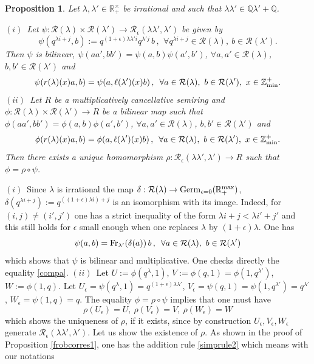 \documentclass[noams,lp]{compositio}
\newtheorem{prop}[thm]{Proposition}
\def\Q{{\mathbb Q}}
\def\R{{\mathbb R}}
\def\Z{{\mathbb Z}}
\def\cR{{\mathcal R}}
\def\qqq{\,,\,~\forall}
\def\zminp{\Z_{\rm min}^+}
\def\mc{multiplicatively cancellative }
\def\rmax{\R_+^{\rm max}}
\def\fr{{\rm Fr}}
\def\germ{{{\rm Germ}_{\epsilon=0}(\rmax)}}
\begin{document}
\begin{prop}\label{frobcorres2} Let  $\lambda, \lambda'\in \R_+^\times$ be irrational and such that $\lambda\lambda'\in \Q\lambda'+\Q$.

$(i)$~Let $\psi:\cR(\lambda)\times\cR(\lambda')\to \cR_\epsilon(\lambda\lambda',\lambda')$ be given by 
$$
\psi(q^{\lambda i+j},b):=q^{(1+\epsilon)\lambda\lambda' i}q^{\lambda'j}\,b    \qqq q^{\lambda i+j}\in \cR(\lambda),\ b\in \cR(\lambda').
$$
Then $\psi$ is bilinear, $\psi(aa',bb')=\psi(a,b)\psi(a',b')$, $\forall a,a' \in \cR(\lambda)$, $b,b' \in \cR(\lambda')$ and 
\begin{equation}\label{compa}
\psi(r(\lambda)(x)a,b)=\psi(a,\ell(\lambda')(x)b)\qqq a\in \cR(\lambda),\ b\in \cR(\lambda'), \ x\in \zminp.
\end{equation}
$(ii)$~Let $R$ be a \mc semiring and $\phi:\cR(\lambda)\times\cR(\lambda')\to R$ be a bilinear map such that
$\phi(aa',bb')=\phi(a,b)\phi(a',b')$, $\forall a,a' \in \cR(\lambda)$, $b,b' \in \cR(\lambda')$ and
\begin{equation}\label{hypo1bis}
\phi(r(\lambda)(x)a,b)=\phi(a,\ell(\lambda')(x)b)\qqq a\in \cR(\lambda),\ b\in \cR(\lambda'), \ x\in \zminp.
\end{equation}
Then   there exists a unique homomorphism $\rho: \cR_\epsilon(\lambda\lambda',\lambda')\to R$ such that $\phi=\rho\circ\psi$.
\end{prop}
\proof $(i)$~Since $\lambda$ is irrational the map $\delta:\cR(\lambda)\to \germ$, $\delta(q^{\lambda i+j}):=q^{((1+\epsilon)\lambda i)+j}$ is an isomorphism with its image. Indeed, for $(i,j)\neq (i',j')$ one has a strict inequality of the form $\lambda i+j<\lambda i'+j'$ and this still holds for $\epsilon$ small enough when one replaces $\lambda$ by $(1+\epsilon)\lambda$.  One has 
$$
\psi(a,b)=\fr_{\lambda'}(\delta(a))\, b\qqq a\in \cR(\lambda),\ b\in \cR(\lambda')
$$
which shows that $\psi$ is bilinear and multiplicative. One checks directly the equality \eqref{compa}.\newline
$(ii)$~Let $U:=\phi(q^\lambda,1)$, $V:=\phi(q,1)=\phi(1,q^{\lambda'})$,  $W:=\phi(1,q)$. Let $U_\epsilon=\psi(q^\lambda,1)=q^{(1+\epsilon)\lambda\lambda'}$, $V_\epsilon=\psi(q,1)=\psi(1,q^{\lambda'})=q^{\lambda'}$,  $W_\epsilon=\psi(1,q)=q$. The equality $\phi=\rho\circ\psi$ implies that one must have 
\begin{equation}\label{unique}
\rho(U_\epsilon)=U, \    \rho(V_\epsilon)=V, \    \rho(W_\epsilon)=W  
\end{equation}
which shows the uniqueness of $\rho$, if it exists, since by construction $U_\epsilon,V_\epsilon,W_\epsilon$ generate $\cR_\epsilon(\lambda\lambda',\lambda')$. Let us  show the existence of $\rho$. As shown in the proof of Proposition \ref{frobcorres1}, one has the addition rule \eqref{simprule2} which means with our notations
\end{document}
